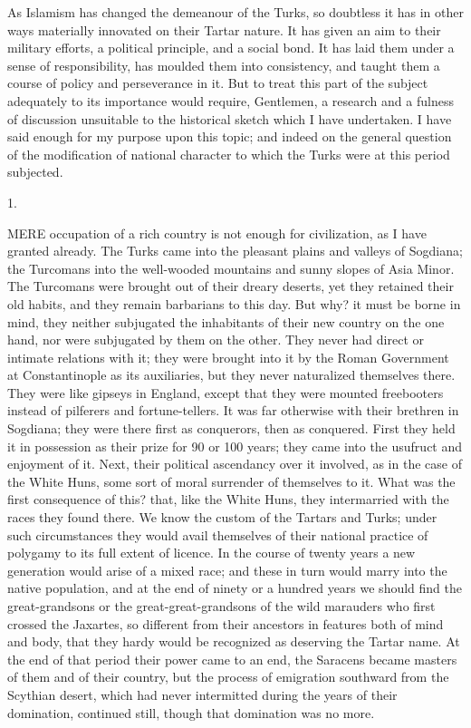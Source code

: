 As Islamism has changed the
demeanour of the Turks, so doubtless it has in other ways materially
innovated on their Tartar nature. It has given an aim to their
military efforts, a political principle, and a social bond. It has
laid them under a sense of responsibility, has moulded them into
consistency, and taught them a course of policy and perseverance in
it. But to treat this part of the subject adequately to its importance
would require, Gentlemen, a research and a fulness of discussion
unsuitable to the historical sketch which I have undertaken. I have
said enough for my purpose upon this topic; and indeed on the general
question of the modification of national character to which the Turks
were at this period subjected.


1.

MERE
occupation of a rich country is not enough for civilization, as I have
granted already. The Turks came into the pleasant plains and valleys
of Sogdiana; the Turcomans into the well-wooded mountains and sunny
slopes of Asia Minor. The Turcomans were brought out of their dreary
deserts, yet they retained their old habits, and they remain
barbarians to this day. But why? it must be borne in mind, they
neither subjugated the inhabitants of their new country on the one
hand, nor were subjugated by them on the other. They never had direct
or intimate relations with it; they were brought into it by the Roman
Government at Constantinople as its auxiliaries, but they never
naturalized themselves there. They were like gipseys in England,
except that they were mounted freebooters instead of pilferers and
fortune-tellers. It was far otherwise with their brethren in Sogdiana;
they were there first as conquerors, then as conquered. First they
held it in possession as their prize for 90 or 100 years; they came
into the usufruct and enjoyment of it. Next, their political
ascendancy over it involved, as in the case of the White Huns, some
sort of moral surrender of themselves to it. What was the first
consequence of this? that, like the White Huns, they intermarried with
the races they found there. We know the custom of the Tartars and
Turks; under such circumstances they would avail themselves of
their national practice of polygamy to its full extent of licence. In
the course of twenty years a new generation would arise of a mixed
race; and these in turn would marry into the native population, and at
the end of ninety or a hundred years we should find the
great-grandsons or the great-great-grandsons of the wild marauders who
first crossed the Jaxartes, so different from their ancestors in
features both of mind and body, that they hardy would be recognized as
deserving the Tartar name. At the end of that period their power came
to an end, the Saracens became masters of them and of their country,
but the process of emigration southward from the Scythian desert,
which had never intermitted during the years of their domination,
continued still, though that domination was no more.

